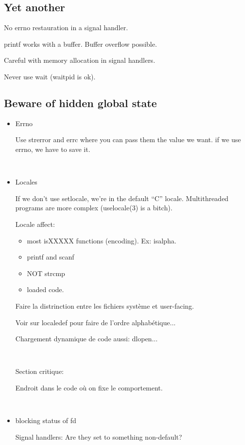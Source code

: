 \documentclass[a4paper,11pt]{article}
\begin{document}
\subsection{Yet another}

No errno restauration in a signal handler.

printf works with a buffer. Buffer overflow possible.

Careful with memory allocation in signal handlers.

Never use wait (waitpid is ok).

\subsection{Beware of hidden global state}

\begin{itemize}
\item Errno

  Use strerror and errc where you can pass them the value we want. if we use
  errno, we have to save it.

  \

\item Locales

  If we don't use setlocale, we're in the default ``C'' locale. Multithreaded
  programs are more complex (uselocale(3) is a bitch).

  Locale affect:
  \begin{itemize}
  \item most isXXXXX functions (encoding). Ex: isalpha.
  \item printf and scanf
  \item NOT strcmp
  \item loaded code.
  \end{itemize}

  Faire la distrinction entre les fichiers système et user-facing.

  Voir sur localedef pour faire de l'ordre alphabétique...

  Chargement dynamique de code aussi: dlopen...

  \

  Section critique:

  Endroit dans le code où on fixe le comportement.

  \

\item blocking status of fd

  Signal handlers: Are they set to something non-default?


\end{itemize}
\end{document}
